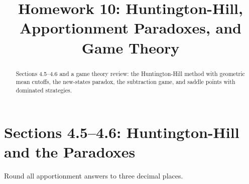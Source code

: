 \documentclass[12pt]{ximera}
\title{Homework 10: Huntington-Hill, Apportionment Paradoxes, and Game Theory}
\begin{document}
\begin{abstract}
Sections 4.5--4.6 and a game theory review: the Huntington-Hill method with geometric
mean cutoffs, the new-states paradox, the subtraction game, and saddle points with
dominated strategies.
\end{abstract}
\maketitle

\section*{Sections 4.5--4.6: Huntington-Hill and the Paradoxes}

Round all apportionment answers to three decimal places.
\end{document}
